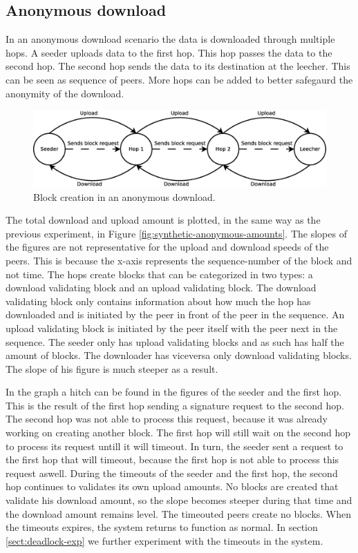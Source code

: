 \subsection{Anonymous download}
In an anonymous download scenario the data is downloaded through multiple hops.
A seeder uploads data to the first hop.
This hop passes the data to the second hop.
The second hop sends the data to its destination at the leecher.
This can be seen as sequence of peers.
More hops can be added to better safegaurd the anonymity of the download.

\begin{figure}
	\centerline{\includegraphics[scale=0.3]{experimentation/anonymous/seeder-hops-leecher.eps}}
	\caption{Block creation in an anonymous download.}
	\label{fig:seeder-leecher}
\end{figure}

The total download and upload amount is plotted, in the same way as the previous experiment,
in Figure \ref{fig:synthetic-anonymous-amounts}.
The slopes of the figures are not representative for the upload and download speeds of the peers.
This is because the x-axis represents the sequence-number of the block and not time.
The hops create blocks that can be categorized in two types:
a download validating block and an upload validating block.
The download validating block only contains information about how much the hop has downloaded
and is initiated by the peer in front of the peer in the sequence.
An upload validating block is initiated by the peer itself with the peer next in the sequence.
The seeder only has upload validating blocks and as such has half the amount of blocks.
The downloader has viceversa only download validating blocks.
The slope of his figure is much steeper as a result.

In the graph a hitch can be found in the figures of the seeder and the first hop.
This is the result of the first hop sending a signature request to the second hop.
The second hop was not able to process this request,
because it was already working on creating another block.
The first hop will still wait on the second hop to process its request untill it will timeout.
In turn, the seeder sent a request to the first hop that will timeout,
because the first hop is not able to process this request aswell.
During the timeouts of the seeder and the first hop,
the second hop continues to validates its own upload amounts.
No blocks are created that validate his download amount,
so the slope becomes steeper during that time and the download amount remains level.
The timeouted peers create no blocks.
When the timeouts expires, the system returns to function as normal.
In section \ref{sect:deadlock-exp} we further experiment with the timeouts in the system.

